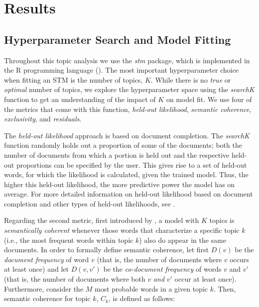 \documentclass[12pt]{article}
\begin{document}
\section{Results}

\subsection{Hyperparameter Search and Model Fitting}

Throughout this topic analysis we use the \textit{stm} package, which is implemented in the R programming language (\citealp{stm}). The most important hyperparameter choice when fitting an STM is the number of topics, $K$. While there is no \textit{true} or \textit{optimal} number of topics, we explore the hyperparameter space using the \textit{searchK} function to get an understanding of the impact of $K$ on model fit. We use four of the metrics that come with this function, \textit{held-out likelihood}, \textit{semantic coherence}, \textit{exclusivity}, and \textit{residuals}.

The \textit{held-out likelihood} approach is based on document completion. The \textit{searchK} function randomly holds out a proportion of some of the documents; both the number of documents from which a portion is held out and the respective held-out proportions can be specified by the user. This gives rise to a set of held-out words, for which the likelihood is calculated, given the trained model. Thus, the higher this held-out likelihood, the more predictive power the model has on average. For more detailed information on held-out likelihood based on document completion and other types of held-out likelihoods, see \cite{wallach2009evaluation}.

Regarding the second metric, first introduced by \cite{mimno2011optimizing}, a model with $K$ topics is \textit{semantically coherent} whenever those words that characterize a specific topic $k$ (i.e., the most frequent words within topic $k$) also do appear in the same documents. In order to formally define semantic coherence, let first $D(v)$ be the \textit{document frequency} of word $v$ (that is, the number of documents where $v$ occurs at least once) and let $D(v, v')$ be the \textit{co-document frequency} of words $v$ and $v'$ (that is, the number of documents where both $v$ \textit{and} $v'$ occur at least once). Furthermore, consider the $M$ most probable words in a given topic $k$. Then, semantic coherence for topic $k$, $C_{k}$, is defined as follows:
\end{document}
